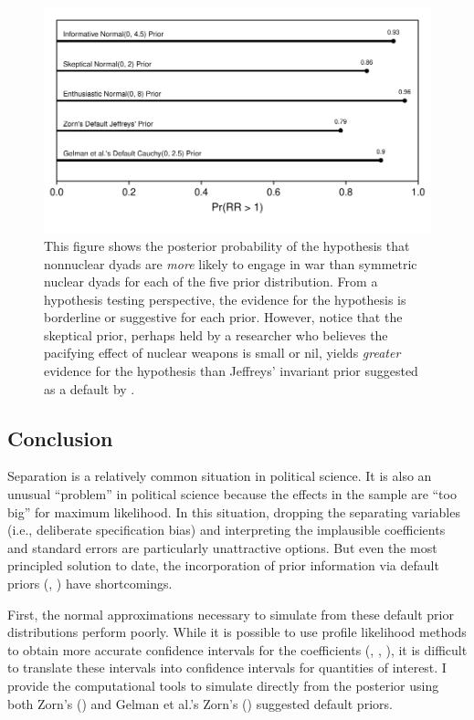 \documentclass[12pt]{article}
\begin{document}
\begin{figure}[H]
\begin{center}
\includegraphics[scale = .8]{figs/bm-pr-hypothesis.pdf}
\caption{This figure shows the posterior probability of the hypothesis that nonnuclear dyads are \emph{more} likely to engage in war than symmetric nuclear dyads for each of the five prior distribution. From a hypothesis testing perspective, the evidence for the hypothesis is borderline or suggestive for each prior. However, notice that the skeptical prior, perhaps held by a researcher who believes the pacifying effect of nuclear weapons is small or nil, yields \emph{greater} evidence for the hypothesis than Jeffreys' invariant prior suggested as a default by \cite{Zorn2005}.}\label{fig:bm-pr-hypothesis}
\end{center}
\end{figure}

\subsection*{Conclusion}

Separation is a relatively common situation in political science. It is also an unusual ``problem'' in political science because the effects in the sample are ``too big'' for maximum likelihood. In this situation, dropping the separating variables (i.e., deliberate specification bias) and interpreting the implausible coefficients and standard errors are particularly unattractive options. But even the most principled solution to date, the incorporation of prior information via default priors (\citealt{Zorn2005}, \citealt{Gelmanetal2008}) have shortcomings.

First, the normal approximations necessary to simulate from these default prior distributions perform poorly. While it is possible to use profile likelihood methods to obtain more accurate confidence intervals for the coefficients (\citealt{Zorn2005}, \cite{HeinzeSchemper2002}, \cite{McCullaghNelder1989}), it is difficult to translate these intervals into confidence intervals for quantities of interest. I provide the computational tools to simulate directly from the posterior using both Zorn's (\citeyear{Zorn2005}) and Gelman et al.'s Zorn's (\citeyear{Gelmanetal2008}) suggested default priors.
\end{document}
